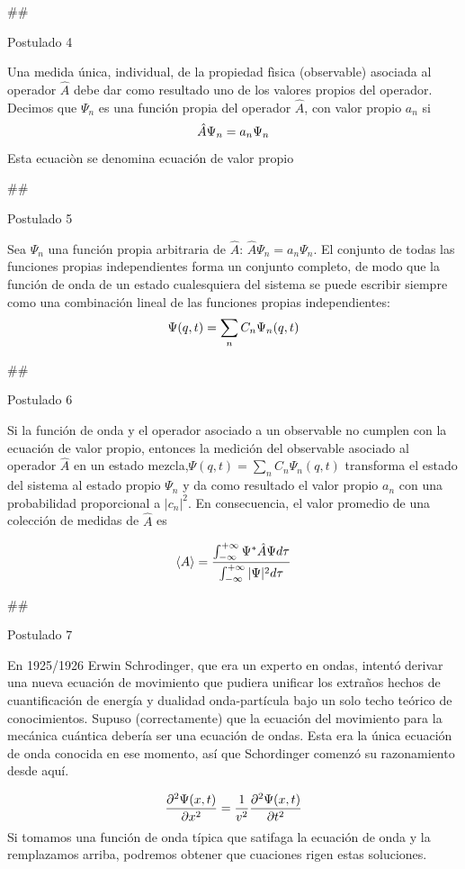 \documentclass[11pt]{article}
\begin{document}
    \#\#

Postulado 4

    Una medida única, individual, de la propiedad fìsica (observable)
asociada al operador \(\hat{A}\) debe dar como resultado uno de los
valores propios del operador. Decimos que \(\Psi_n\) es una función
propia del operador \(\hat{A}\), con valor propio \(a_n\) si
\[\large \hat{A}\Psi_{n}=a_n\Psi_{n}\] {Esta ecuaciòn se denomina
ecuación de valor propio}

    \#\#

Postulado 5

    Sea \(\Psi_{n}\) una función propia arbitraria de \(\hat{A}\):
\(\hat{A}\Psi_{n}= a_n\Psi_{n}\). El conjunto de todas las funciones
propias independientes forma un conjunto completo, de modo que la
función de onda de un estado cualesquiera del sistema se puede escribir
siempre como una combinación lineal de las funciones propias
independientes: \[\large \Psi(q,t)=\sum_{n} C_{n}\Psi_{n}(q,t)\]

    \#\#

Postulado 6

    Si la función de onda y el operador asociado a un observable no cumplen
con {la ecuación de valor propio}, entonces la medición del observable
asociado al operador \(\hat{A}\) en un estado
mezcla,\(\Psi(q,t)=\sum_{n} C_{n}\Psi_{n}(q,t)\) transforma el estado
del sistema al estado propio \(\Psi_{n}\) y da como resultado el valor
propio \(a_n\) con una probabilidad proporcional a \(|c_n|^2\). En
consecuencia, el valor promedio de una colección de medidas de
\(\hat{A}\) es

\[\large \left<A\right>=\frac{\int^{+\infty}_{-\infty} \Psi^* \hat{A}\Psi d\tau}{\int^{+\infty}_{-\infty} |\Psi|^2d\tau}\]

    \#\#

Postulado 7

    En 1925/1926 Erwin Schrodinger, que era un experto en ondas, intentó
derivar una nueva ecuación de movimiento que pudiera unificar los
extraños hechos de cuantificación de energía y dualidad onda-partícula
bajo un solo techo teórico de conocimientos. Supuso (correctamente) que
la ecuación del movimiento para la mecánica cuántica debería ser una
ecuación de ondas. Esta era la única ecuación de onda conocida en ese
momento, así que Schordinger comenzó su razonamiento desde aquí.

\[\large \frac{\partial^2 \Psi(x,t)}{\partial x^2}=\frac{1}{v^2}\frac{\partial^2 \Psi(x,t)}{\partial t^2}\]
Si tomamos una función de onda típica que satifaga la ecuación de onda y
la remplazamos arriba, podremos obtener que cuaciones rigen estas
soluciones.
\end{document}
